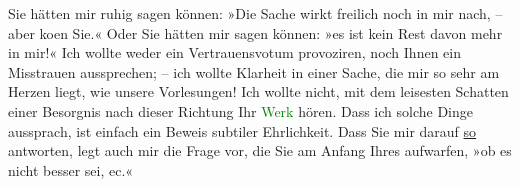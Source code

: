 \pstart
           Sie hätten mir ruhig sagen können: »Die Sache wirkt freilich noch in mir nach, – aber
                  ko{\geminationm}en {\pb}Sie.« Oder Sie hätten mir sagen
               können: »es ist kein Rest davon mehr in mir!« Ich wollte weder ein Vertrauensvotum
               provoziren, noch Ihnen ein Misstrauen aussprechen; – ich wollte Klarheit in einer
               Sache, die mir so sehr am Herzen liegt, wie unsere Vorlesungen! Ich wollte nicht, mit
               dem leisesten Schatten einer Besorgnis nach dieser Richtung Ihr \textcolor{green}{Werk}{}\ledrightnote{{$\rightarrow$}\textcolor{green}{Der einsame Weg. Schauspiel in fünf Akten}} hören. Dass ich solche Dinge
               aussprach, ist einfach ein Beweis subtiler Ehrlichkeit. Dass Sie mir darauf \uline{so} antworten, legt auch mir die Frage vor, die Sie am
               Anfang Ihres \label{K_L03355-4v}\label{K_L03355-4h} aufwarfen, »ob es nicht besser sei, ec.«\pend
           
